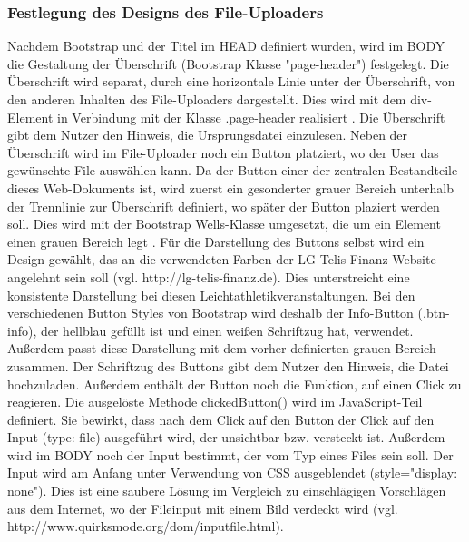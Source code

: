 \subsubsection{Festlegung des Designs des File-Uploaders}
Nachdem Bootstrap und der Titel im HEAD definiert wurden, wird im BODY die Gestaltung der Überschrift (Bootstrap Klasse "page-header") festgelegt. Die Überschrift wird separat, durch eine horizontale Linie unter der Überschrift, von den anderen Inhalten des File-Uploaders dargestellt. Dies wird mit dem div-Element in Verbindung mit der Klasse .page-header realisiert \cite{header}. Die Überschrift gibt dem Nutzer den Hinweis, die Ursprungsdatei einzulesen.
Neben der Überschrift wird im File-Uploader noch ein Button platziert, wo der User das gewünschte File auswählen kann. Da der Button einer der zentralen Bestandteile dieses Web-Dokuments ist, wird zuerst ein gesonderter grauer Bereich unterhalb der Trennlinie zur Überschrift definiert, wo später der Button plaziert werden soll. Dies wird mit der Bootstrap Wells-Klasse umgesetzt, die um ein Element einen grauen Bereich legt \cite{wells}. 
Für die Darstellung des Buttons selbst wird ein Design gewählt, das an die verwendeten Farben der LG Telis Finanz-Website angelehnt sein soll (vgl. http://lg-telis-finanz.de). Dies unterstreicht eine konsistente Darstellung bei diesen Leichtathletikveranstaltungen. Bei den verschiedenen Button Styles von Bootstrap wird deshalb der Info-Button (.btn-info), der hellblau gefüllt ist und einen weißen Schriftzug hat, verwendet. Außerdem passt diese Darstellung mit dem vorher definierten grauen Bereich zusammen. Der Schriftzug des Buttons gibt dem Nutzer den Hinweis, die Datei hochzuladen. Außerdem enthält der Button noch die Funktion, auf einen Click zu reagieren. Die ausgelöste Methode clickedButton() wird im JavaScript-Teil definiert. Sie bewirkt, dass nach dem Click auf den Button der Click auf den Input (type: file) ausgeführt wird, der unsichtbar bzw. versteckt ist.
Außerdem wird im BODY noch der Input bestimmt, der vom Typ eines Files sein soll. Der Input wird am Anfang unter Verwendung von CSS ausgeblendet (style="display: none"). Dies ist eine saubere Lösung im Vergleich zu einschlägigen Vorschlägen aus dem Internet, wo der Fileinput mit einem Bild verdeckt wird (vgl. http://www.quirksmode.org/dom/inputfile.html).

